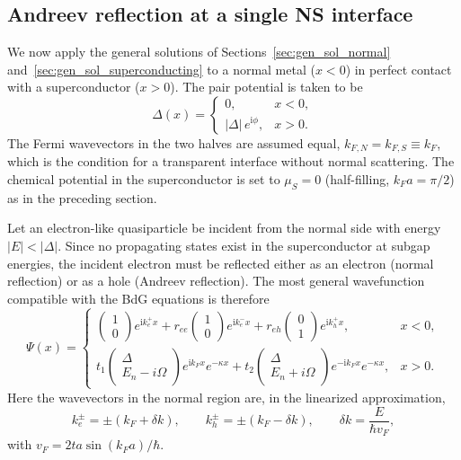 \documentclass[11pt,a4paper,twoside,openany]{report}
\begin{document}
 

\subsection{Andreev reflection at a single NS interface}

We now apply the general solutions of Sections~\ref{sec:gen_sol_normal} and~\ref{sec:gen_sol_superconducting} to a normal metal ($x<0$) in perfect contact with a superconductor ($x>0$).  The pair potential is taken to be
\begin{equation}
  \Delta(x) = \begin{cases}
    0,                     & x < 0, \\
    |\Delta|\,e^{\mathrm{i}\phi},  & x > 0 .
  \end{cases}
\end{equation}
The Fermi wavevectors in the two halves are assumed equal, $k_{F,N}=k_{F,S}\equiv k_F$, which is the condition for a transparent interface without normal scattering.  The chemical potential in the superconductor is set to $\mu_S=0$ (half-filling, $k_F a=\pi/2$) as in the preceding section.


Let an electron-like quasiparticle be incident from the normal side with energy $|E|<|\Delta|$.  Since no propagating states exist in the superconductor at subgap energies, the incident electron must be reflected either as an electron (normal reflection) or as a hole (Andreev reflection).  The most general wavefunction compatible with the BdG equations is therefore
\begin{equation}
  \Psi(x) = \begin{cases}
    \displaystyle
    \begin{pmatrix} 1 \\ 0 \end{pmatrix} e^{\mathrm{i} k_e^+ x}
    + r_{ee} \begin{pmatrix} 1 \\ 0 \end{pmatrix} e^{\mathrm{i} k_e^- x}
    + r_{eh} \begin{pmatrix} 0 \\ 1 \end{pmatrix} e^{\mathrm{i} k_h^+ x},
    & x < 0, \\[14pt]
    \displaystyle
    t_1\begin{pmatrix} \Delta \\ E_n - i\Omega \end{pmatrix} e^{\mathrm{i} k_F x} e^{-\kappa x}
    + t_2\begin{pmatrix} \Delta \\ E_n + i\Omega \end{pmatrix} e^{-\mathrm{i} k_F x} e^{-\kappa x},
    & x > 0 .
  \end{cases}
  \label{eq:Psi_NS}
\end{equation}
Here the wavevectors in the normal region are, in the linearized approximation,
\[
  k_e^\pm = \pm(k_F+\delta k), \qquad
  k_h^\pm = \pm(k_F-\delta k), \qquad
  \delta k = \frac{E}{\hbar v_F},
\]
with $v_F = 2ta\sin(k_F a)/\hbar$.  
\end{document}
